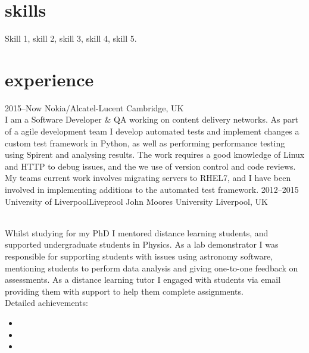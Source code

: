 \documentclass[]{cv-style}          %
\begin{document}
\section{skills}
  \vspace{-0.2cm}

Skill 1, skill 2, skill 3, skill 4, skill 5.


\section{experience}

\begin{entrylist}
\entry
  {2015--Now}
  {Nokia/Alcatel-Lucent}
  {Cambridge, UK}
  {\\
  I am a Software Developer \& QA working on content delivery networks. As part of a agile development team I develop automated tests and implement changes a custom test framework in Python, as well as performing performance testing using Spirent and analysing results. The work requires a good knowledge of Linux and HTTP to debug issues, and the we use of version control and code reviews. My teams current work involves migrating servers to RHEL7, and I have been involved in implementing additions to the automated test framework.}
\entry
  {2012--2015}
  {University of Liverpool\/Liveprool John Moores University}
  {Liverpool, UK}
  {\\
  Whilst studying for my PhD I mentored distance learning students, and supported undergraduate students in Physics. As a lab demonstrator I was responsible for supporting students with issues using astronomy software, mentioning students to perform data analysis and giving one-to-one feedback on assessments.  As a distance learning tutor I engaged with students via email providing them with support to help them complete assignments.\\
  Detailed achievements:
  \begin{itemize}
    \item 
    \item 
    \item 
  \end{itemize}}

\end{entrylist}
\end{document}
